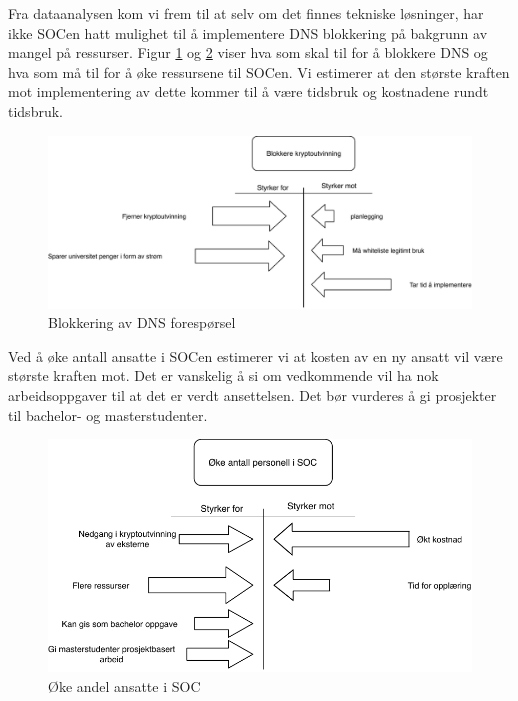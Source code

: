 Fra dataanalysen kom vi frem til at selv om det finnes tekniske løsninger, har ikke SOCen hatt mulighet til å implementere DNS blokkering på bakgrunn av mangel på ressurser. Figur \ref{fig:Blokkering} og \ref{fig:Oke-antall} viser hva som skal til for å blokkere DNS og hva som må til for å øke ressursene til SOCen. Vi estimerer at den største kraften mot implementering av dette kommer til å være tidsbruk og kostnadene rundt tidsbruk.    
 \begin{figure}[H]
    \centering
    \includegraphics[scale=0.6]{case_3/bilder/Force-Field3.pdf}
    \caption[Blokkering]{Blokkering av DNS forespørsel}
    \label{fig:Blokkering}
\end{figure}


Ved å øke antall ansatte i SOCen estimerer vi at kosten av en ny ansatt vil være største kraften mot. Det er vanskelig å si om vedkommende vil ha nok arbeidsoppgaver til at det er verdt ansettelsen. Det bør vurderes å gi prosjekter til bachelor- og masterstudenter. 
 \begin{figure}[H]
    \hspace{3.6cm}
    \includegraphics[scale=0.6]{case_3/bilder/Force-field4.pdf}
    \caption[Øke antall ansette i SOC]{Øke andel ansatte i SOC}
    \label{fig:Oke-antall}
\end{figure}


